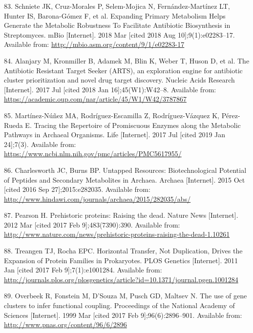 \documentclass[12pt,twoside]{reedthesis}
\begin{document}
  \hypertarget{ref-schniete_expanding_2018}{}
  83. Schniete JK, Cruz-Morales P, Selem-Mojica N, Fernández-Martínez LT,
  Hunter IS, Barona-Gómez F, et al. Expanding Primary Metabolism Helps
  Generate the Metabolic Robustness To Facilitate Antibiotic Biosynthesis
  in Streptomyces. mBio {[}Internet{]}. 2018 Mar {[}cited 2018 Aug
  10{]};9(1):e02283--17. Available from:
  \url{http://mbio.asm.org/content/9/1/e02283-17}
  
  \hypertarget{ref-alanjary_antibiotic_2017}{}
  84. Alanjary M, Kronmiller B, Adamek M, Blin K, Weber T, Huson D, et al.
  The Antibiotic Resistant Target Seeker (ARTS), an exploration engine for
  antibiotic cluster prioritization and novel drug target discovery.
  Nucleic Acids Research {[}Internet{]}. 2017 Jul {[}cited 2018 Jan
  16{]};45(W1):W42--8. Available from:
  \url{https://academic.oup.com/nar/article/45/W1/W42/3787867}
  
  \hypertarget{ref-martinez-nunez_promiscuity_Archaea_2017}{}
  85. Martínez-Núñez MA, Rodríguez-Escamilla Z, Rodríguez-Vázquez K,
  Pérez-Rueda E. Tracing the Repertoire of Promiscuous Enzymes along the
  Metabolic Pathways in Archaeal Organisms. Life {[}Internet{]}. 2017 Jul
  {[}cited 2019 Jan 24{]};7(3). Available from:
  \url{https://www.ncbi.nlm.nih.gov/pmc/articles/PMC5617955/}
  
  \hypertarget{ref-charlesworth_untapped_natural_products_Archaea_2015}{}
  86. Charlesworth JC, Burns BP. Untapped Resources: Biotechnological
  Potential of Peptides and Secondary Metabolites in Archaea. Archaea
  {[}Internet{]}. 2015 Oct {[}cited 2016 Sep 27{]};2015:e282035. Available
  from: \url{http://www.hindawi.com/journals/archaea/2015/282035/abs/}
  
  \hypertarget{ref-pearson_prehistoric_2012}{}
  87. Pearson H. Prehistoric proteins: Raising the dead. Nature News
  {[}Internet{]}. 2012 Mar {[}cited 2017 Feb 9{]};483(7390):390. Available
  from:
  \url{http://www.nature.com/news/prehistoric-proteins-raising-the-dead-1.10261}
  
  \hypertarget{ref-treangen_horizontal_2011}{}
  88. Treangen TJ, Rocha EPC. Horizontal Transfer, Not Duplication, Drives
  the Expansion of Protein Families in Prokaryotes. PLOS Genetics
  {[}Internet{]}. 2011 Jan {[}cited 2017 Feb 9{]};7(1):e1001284. Available
  from:
  \url{http://journals.plos.org/plosgenetics/article?id=10.1371/journal.pgen.1001284}
  
  \hypertarget{ref-overbeek_use_1999}{}
  89. Overbeek R, Fonstein M, D'Souza M, Pusch GD, Maltsev N. The use of
  gene clusters to infer functional coupling. Proceedings of the National
  Academy of Sciences {[}Internet{]}. 1999 Mar {[}cited 2017 Feb
  9{]};96(6):2896--901. Available from:
  \url{http://www.pnas.org/content/96/6/2896}
  
\end{document}
